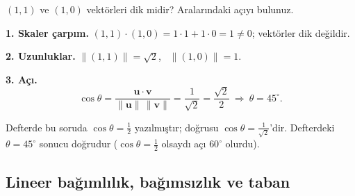 \begin{soru}
$(1,1)$ ve $(1,0)$ vektörleri dik midir? Aralarındaki açıyı bulunuz.
\end{soru}
\begin{cevap}
\textbf{1. Skaler çarpım.} $(1,1)\cdot(1,0)=1\cdot1+1\cdot0=1\neq0$; vektörler dik değildir.

\textbf{2. Uzunluklar.} $\|(1,1)\|=\sqrt2$, \ $\|(1,0)\|=1$.

\textbf{3. Açı.}
\[
\cos\theta=\frac{\mathbf u\cdot\mathbf v}{\|\mathbf u\|\,\|\mathbf v\|}=\frac{1}{\sqrt2}=\frac{\sqrt2}{2}\ \Rightarrow\ \theta=45^\circ .
\]
\end{cevap}

\begin{dikkat}
Defterde bu soruda $\cos\theta=\frac12$ yazılmıştır; doğrusu $\cos\theta=\frac{1}{\sqrt2}$'dir. Defterdeki $\theta=45^\circ$ sonucu doğrudur ($\cos\theta=\frac12$ olsaydı açı $60^\circ$ olurdu).
\end{dikkat}

\subsection{Lineer bağımlılık, bağımsızlık ve taban}

